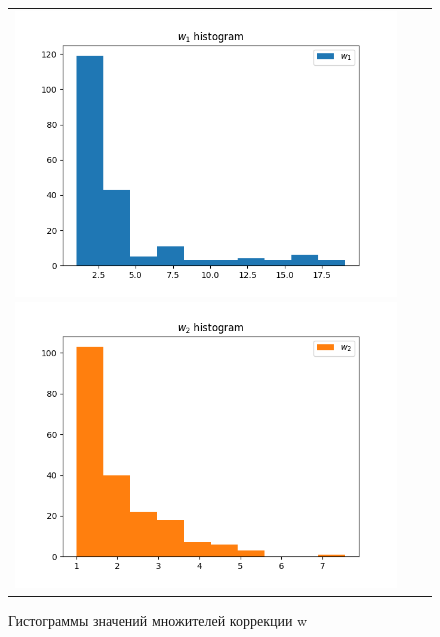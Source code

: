 \documentclass[a4paper,14pt]{article}
\begin{document}
	\begin{figure}[H]
		\begin{tabular}{ccc}
			\includegraphics[scale=0.5]{../image/whyst_PR1.png}
			\includegraphics[scale=0.5]{../image/whyst_PR2.png}
		\end{tabular}
		\caption{Гистограммы значений множителей коррекции w} 
	\end{figure}
	
\end{document}
